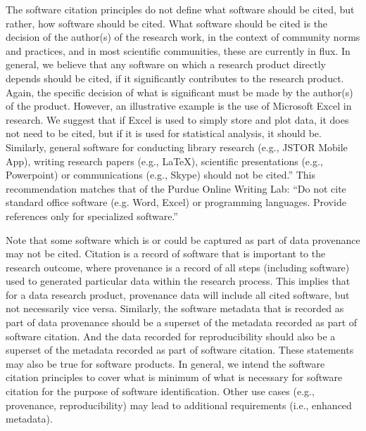 \documentclass[11pt, oneside]{amsart}
\newcommand{\dmnote}[1]{ {\textcolor{purple} { ***DM: #1 }}} %
\newcommand{\ssnote}[1]{ {\textcolor{bondiblue} { ***SS: #1}}} %
\begin{document}
The software citation principles do not define what software should be cited, but rather, how software should be cited.
What software should be cited is the decision of the author(s) of the research work, in the context of community norms and practices, and in most scientific communities, these are currently in flux.
In general, we believe that any software on which a research product directly depends should be cited, if it significantly contributes to the research product.
Again, the specific decision of what is significant must be made by the author(s) of the product.
However, an illustrative example is the use of Microsoft Excel in research.
We suggest that if Excel is used to simply store and plot data, it does not need to be cited, but if it is used for statistical analysis, it should be.  Similarly, general software for conducting library research (e.g., JSTOR Mobile App), writing research papers (e.g., \LaTeX), scientific presentations (e.g., Powerpoint) or communications (e.g., Skype) should not be cited.''
This recommendation matches that of the Purdue Online Writing Lab: ``Do not cite standard office software (e.g. Word, Excel) or programming languages.  Provide references only for specialized software.''~\cite{powl-citing-software}

Note that some software which is or could be captured as part of data provenance may not be cited.
Citation is a record of software that is important to the research outcome, where provenance is a record of all steps (including software) used to generated particular data within the research process.
This implies that for a data research product, provenance data will include all cited software, but not necessarily vice versa.
Similarly, the software metadata that is recorded as part of data provenance should be a superset of the metadata recorded as part of software citation.
And the data recorded for reproducibility should also be a superset of the metadata recorded as part of software citation.
These statements may also be true for software products.
In general, we intend the software citation principles to cover what is minimum of what is necessary for software citation for the purpose of software identification.
Other use cases (e.g., provenance, reproducibility) may lead to additional requirements (i.e., enhanced metadata).
\end{document}

